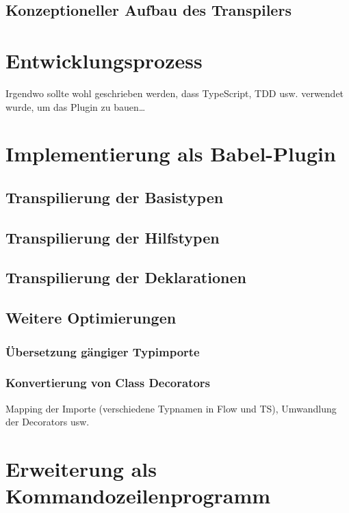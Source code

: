 
\subsection{Konzeptioneller Aufbau des Transpilers}

\section{Entwicklungsprozess}
  Irgendwo sollte wohl geschrieben werden, dass TypeScript, TDD usw. verwendet wurde, um das Plugin zu bauen\dots

\section{Implementierung als Babel-Plugin}
  \subsection{Transpilierung der Basistypen}
  \subsection{Transpilierung der Hilfstypen}
  \subsection{Transpilierung der Deklarationen}

  \subsection{Weitere Optimierungen}
    \subsubsection{Übersetzung gängiger Typimporte}
    \subsubsection{Konvertierung von Class Decorators}

  Mapping der Importe (verschiedene Typnamen in Flow und TS), Umwandlung der Decorators usw.

\section{Erweiterung als Kommandozeilenprogramm}

